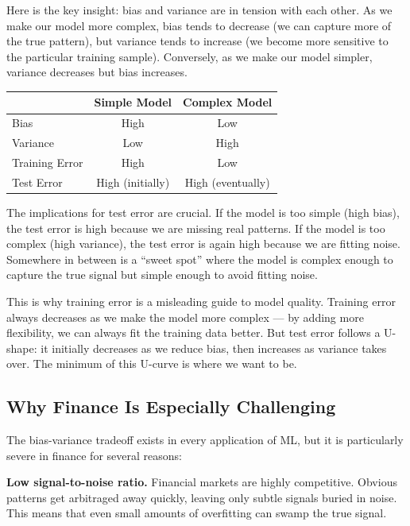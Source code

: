 \documentclass[11pt,a4paper]{article}
\begin{document}
Here is the key insight: bias and variance are in tension with each other. As we make our model more complex, bias tends to decrease (we can capture more of the true pattern), but variance tends to increase (we become more sensitive to the particular training sample). Conversely, as we make our model simpler, variance decreases but bias increases.

\begin{center}
\begin{tabular}{lcc}
\toprule
& \textbf{Simple Model} & \textbf{Complex Model} \\
\midrule
Bias & High & Low \\
Variance & Low & High \\
Training Error & High & Low \\
Test Error & High (initially) & High (eventually) \\
\bottomrule
\end{tabular}
\end{center}

The implications for test error are crucial. If the model is too simple (high bias), the test error is high because we are missing real patterns. If the model is too complex (high variance), the test error is again high because we are fitting noise. Somewhere in between is a ``sweet spot'' where the model is complex enough to capture the true signal but simple enough to avoid fitting noise.

This is why training error is a misleading guide to model quality. Training error always decreases as we make the model more complex — by adding more flexibility, we can always fit the training data better. But test error follows a U-shape: it initially decreases as we reduce bias, then increases as variance takes over. The minimum of this U-curve is where we want to be.

\subsection{Why Finance Is Especially Challenging}

The bias-variance tradeoff exists in every application of ML, but it is particularly severe in finance for several reasons:

\textbf{Low signal-to-noise ratio.} Financial markets are highly competitive. Obvious patterns get arbitraged away quickly, leaving only subtle signals buried in noise. This means that even small amounts of overfitting can swamp the true signal.
\end{document}
